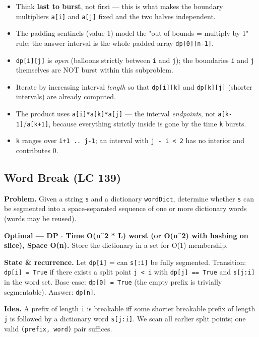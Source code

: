 \documentclass[11pt]{article}
\providecommand{\tightlist}{\setlength{\itemsep}{1pt}\setlength{\parskip}{0pt}}
\begin{document}
\begin{itemize}
\tightlist
\item
  Think \textbf{last to burst}, not first --- this is what makes the boundary multipliers \texttt{a{[}i{]}} and \texttt{a{[}j{]}} fixed and the two halves independent.
\item
  The padding sentinels (value 1) model the "out of bounds = multiply by 1" rule; the answer interval is the whole padded array \texttt{dp{[}0{]}{[}n-1{]}}.
\item
  \texttt{dp{[}i{]}{[}j{]}} is \emph{open} (balloons strictly between \texttt{i} and \texttt{j}); the boundaries \texttt{i} and \texttt{j} themselves are NOT burst within this subproblem.
\item
  Iterate by increasing interval \emph{length} so that \texttt{dp{[}i{]}{[}k{]}} and \texttt{dp{[}k{]}{[}j{]}} (shorter intervals) are already computed.
\item
  The product uses \texttt{a{[}i{]}*a{[}k{]}*a{[}j{]}} --- the interval \emph{endpoints}, not \texttt{a{[}k-1{]}}/\texttt{a{[}k+1{]}}, because everything strictly inside is gone by the time \texttt{k} bursts.
\item
  \texttt{k} ranges over \texttt{i+1\ ..\ j-1}; an interval with \texttt{j\ -\ i\ \textless{}\ 2} has no interior and contributes 0.
\end{itemize}

\subsection{Word Break (LC 139)}\label{word-break-lc-139}

\textbf{Problem.} Given a string \texttt{s} and a dictionary \texttt{wordDict}, determine whether \texttt{s} can be segmented into a space-separated sequence of one or more dictionary words (words may be reused).

\textbf{Optimal --- DP \(\cdot\) Time O(n\^{}2 * L) worst (or O(n\^{}2) with hashing on slice), Space O(n).} Store the dictionary in a set for O(1) membership.

\textbf{State \& recurrence.} Let \texttt{dp{[}i{]}} = can \texttt{s{[}:i{]}} be fully segmented. Transition: \texttt{dp{[}i{]}\ =\ True} if there exists a split point \texttt{j\ \textless{}\ i} with \texttt{dp{[}j{]}\ ==\ True} and \texttt{s{[}j:i{]}} in the word set. Base case: \texttt{dp{[}0{]}\ =\ True} (the empty prefix is trivially segmentable). Answer: \texttt{dp{[}n{]}}.

\textbf{Idea.} A prefix of length \texttt{i} is breakable iff some shorter breakable prefix of length \texttt{j} is followed by a dictionary word \texttt{s{[}j:i{]}}. We scan all earlier split points; one valid \texttt{(prefix,\ word)} pair suffices.
\end{document}
